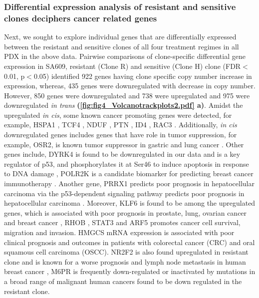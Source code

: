 \subsubsection{Differential expression analysis of resistant and sensitive clones deciphers cancer related genes}
 Next, we sought to explore individual genes that are differentially expressed  between the resistant and sensitive clones of all four treatment regimes in all PDX in the above data. 
 Pairwise comparisons of clone-specific differential gene expression in SA609, resistant (Clone R) and sensitive (Clone H) clone (FDR$<$0.01, p$<$0.05) identified 922 genes having clone specific copy number increase in expression, whereas, 435 genes were downregulated with decrease in copy number. However, 850 genes were downregulated and 738 were upregulated and 975 were downregulated \textit{in trans} \textbf{(\autoref{fig:fig4_Volcanotrackplots2.pdf} a)}.  Amidst the upregulated \textit{in cis}, some known cancer promoting genes were detected, for example, HSPA1 \cite{zoppino2018comprehensive}, TCF4 \cite{ravindranath2011wnt}, NDUF \cite{li2015down}, PTN \cite{huang2018chemotherapy}, ID4 \cite{donzelli2018expression}, RAC3 \cite{donnelly2017rac3}. Additionally, \textit{in cis} downregulated genes includes genes that have role in tumor suppression, for example, OSR2, is known tumor suppressor in gastric and lung cancer \cite{otani2014odd,wang2018odd}. Other genes include, DYRK4 is found to be downregulated in our data and is a key regulator
of p53, and phosphorylates it at Ser46 to induce apoptosis in response to
DNA damage \cite{yoshida2019multiple}, POLR2K is a candidate biomarker for predicting breast cancer immunotherapy \cite{lopez2020prediction}. Another gene, PRRX1 predicts poor prognosis in hepatocellular carcinoma via the p53-dependent signaling pathway predicts poor prognosis in hepatocellular carcinoma \cite{fan2017downregulation}. Moreover,
KLF6 is found to be among the upregulated genes, which is associated with poor prognosis in prostate, lung, ovarian cancer and breast cancer \cite{hatami2013klf6,difeo2009role}, RHOB \cite{ju2018rhob},
STAT3 \cite{li2019clinicopathological,kamran2013role} and 
ARF5 \cite{li2017roles,casalou2020role} promotes cancer cell survival, migration and invasion. HMGCS \cite{chen2017hmgcs2} mRNA expression is associated with poor clinical prognosis and outcomes in
patients with colorectal cancer (CRC) and oral squamous cell carcinoma (OSCC). NR2F2 is also found upregulated in resistant clone and is known for a worse prognosis and lymph node metastasis in human breast cancer \cite{erdHos2020nr2f2,xia2020nr2f2},
M6PR is frequently down-regulated or inactivated by mutations in a broad range of malignant human cancers \cite{dalle2018mannose} found to be down regulated in the resistant clone.

